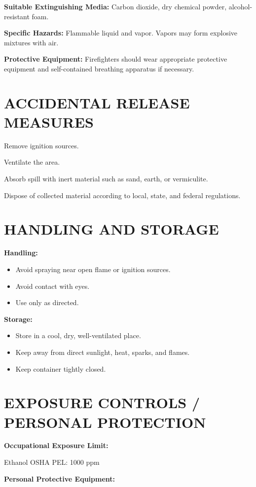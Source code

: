\documentclass[11pt]{article}
\begin{document}
\textbf{Suitable Extinguishing Media:} Carbon dioxide, dry chemical powder, alcohol-resistant foam.

\textbf{Specific Hazards:} Flammable liquid and vapor. Vapors may form explosive mixtures with air.

\textbf{Protective Equipment:} Firefighters should wear appropriate protective equipment and self-contained breathing apparatus if necessary.

\section{ACCIDENTAL RELEASE MEASURES}

Remove ignition sources.

Ventilate the area.

Absorb spill with inert material such as sand, earth, or vermiculite.

Dispose of collected material according to local, state, and federal regulations.

\section{HANDLING AND STORAGE}

\textbf{Handling:}
\begin{itemize}[noitemsep]
    \item Avoid spraying near open flame or ignition sources.
    \item Avoid contact with eyes.
    \item Use only as directed.
\end{itemize}

\textbf{Storage:}
\begin{itemize}[noitemsep]
    \item Store in a cool, dry, well-ventilated place.
    \item Keep away from direct sunlight, heat, sparks, and flames.
    \item Keep container tightly closed.
\end{itemize}

\section{EXPOSURE CONTROLS / PERSONAL PROTECTION}

\textbf{Occupational Exposure Limit:}

Ethanol OSHA PEL: 1000 ppm

\textbf{Personal Protective Equipment:}
\end{document}
